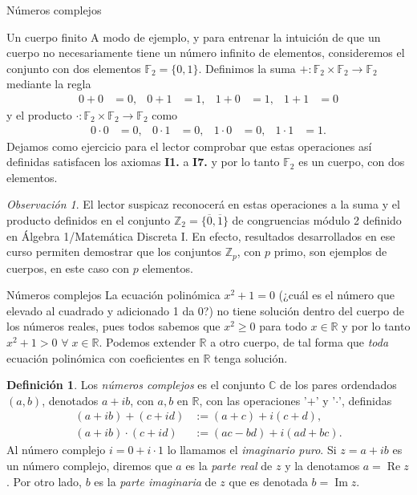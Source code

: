 \documentclass[a4paper,12pt,twoside,spanish,reqno]{amsbook}
\numberwithin{equation}{section}
\theoremstyle{definition}
\newtheorem{definicion}[teorema]{Definici\'on}
\theoremstyle{remark}
\newtheorem*{obs*}{Observaci\'on}
\newcommand{\R}{\mathbb R}
\newcommand{\C}{\mathbb C}
\newcommand{\F}{\mathbb F}
\newcommand{\Z}{\mathbb Z}
\begin{document}
\begin{chapter}{Números complejos}
    
    \begin{subsection}{Un cuerpo finito}
        A modo de ejemplo, y para entrenar la intuición de que un cuerpo no necesariamente tiene un número infinito de elementos, consideremos el conjunto con dos elementos $\F_2=\{0,1\}$. Definimos la suma $+\colon\F_2\times \F_2\to \F_2$ mediante la regla
        \begin{align*}
        0+0&=0, & 0+1&=1, & 1+0&=1, & 1+1&=0
        \end{align*}
        y el producto $\cdot \colon\F_2\times \F_2\to \F_2$ como 
        \begin{align*}
        0\cdot 0&=0, & 0\cdot 1&=0, & 1\cdot 0&=0, & 1\cdot 1&=1.
        \end{align*}
        Dejamos como ejercicio para el lector comprobar que estas operaciones así definidas satisfacen los axiomas {\bf I1.} a {\bf I7.} y por lo tanto $\F_2$ es un cuerpo, con dos elementos.
        
        \begin{obs*}
            El lector suspicaz reconocerá en estas operaciones a la suma y el producto definidos en el conjunto $\Z_2=\{\overline{0},\overline{1}\}$ de congruencias módulo 2  definido en Álgebra 1/Matemática Discreta I. En efecto, resultados desarrollados en ese curso permiten demostrar que los conjuntos $\Z_p$, con $p$ primo, son ejemplos de cuerpos, en este caso con $p$ elementos.
        \end{obs*}
        
    \end{subsection}
    
    
    \begin{section}{Números complejos}\label{seccion-numeros-complejos}
        La ecuación polinómica $x^2 + 1 =0$ (¿cuál es el número que elevado  al cuadrado y adicionado 1 da 0?) no tiene solución dentro del cuerpo de los números reales,  pues todos sabemos que  $x^2 \ge 0$ para todo $x \in \R$ y por lo tanto $x^2 + 1 >0$ $\forall\; x \in \R$. Podemos extender $\R$ a otro cuerpo,  de tal forma que \textit{toda} ecuación polinómica con coeficientes en $\R$ tenga solución. 
        
        \begin{definicion} 
            Los \textit{números complejos} es el conjunto $\C$  de los pares ordendados $(a,b)$,  denotados $a+ib$, con $a, b$  en $\R$, con las operaciones '$+$' y '$\cdot$', definidas
            \begin{align}
            (a+ib)+ (c+id) &:= (a+c) + i(c+d), \label{sumacompleja} \\
            (a+ib) \cdot (c+id) &:= (ac -bd) + i(ad+bc). \label{productocomplejo}
            \end{align}
            Al número complejo $i = 0 + i\cdot 1$ lo llamamos el \textit{imaginario puro}.  Si $z= a + ib$  es un número complejo,  diremos que $a$ es la \textit{parte real} de $z$ y  la denotamos $a = \operatorname{Re} z$. Por otro lado,  $b$ es la \textit{parte  imaginaria} de $z$ que es denotada $b = \operatorname{Im} z$.
        \end{definicion}
        

\end{section}
\end{chapter}
\end{document}
